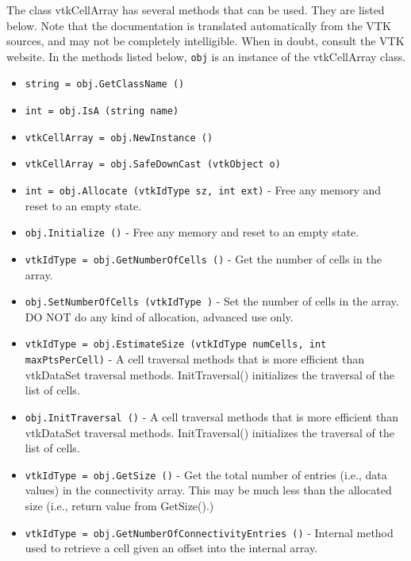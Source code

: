 The class vtkCellArray has several methods that can be used.
  They are listed below.
Note that the documentation is translated automatically from the VTK sources,
and may not be completely intelligible.  When in doubt, consult the VTK website.
In the methods listed below, \verb|obj| is an instance of the vtkCellArray class.
\begin{itemize}
\item  \verb|string = obj.GetClassName ()|

\item  \verb|int = obj.IsA (string name)|

\item  \verb|vtkCellArray = obj.NewInstance ()|

\item  \verb|vtkCellArray = obj.SafeDownCast (vtkObject o)|

\item  \verb|int = obj.Allocate (vtkIdType sz, int ext)| -  Free any memory and reset to an empty state.

\item  \verb|obj.Initialize ()| -  Free any memory and reset to an empty state.

\item  \verb|vtkIdType = obj.GetNumberOfCells ()| -  Get the number of cells in the array.

\item  \verb|obj.SetNumberOfCells (vtkIdType )| -  Set the number of cells in the array.
 DO NOT do any kind of allocation, advanced use only.

\item  \verb|vtkIdType = obj.EstimateSize (vtkIdType numCells, int maxPtsPerCell)| -  A cell traversal methods that is more efficient than vtkDataSet traversal
 methods.  InitTraversal() initializes the traversal of the list of cells.

\item  \verb|obj.InitTraversal ()| -  A cell traversal methods that is more efficient than vtkDataSet traversal
 methods.  InitTraversal() initializes the traversal of the list of cells.

\item  \verb|vtkIdType = obj.GetSize ()| -  Get the total number of entries (i.e., data values) in the connectivity 
 array. This may be much less than the allocated size (i.e., return value 
 from GetSize().)

\item  \verb|vtkIdType = obj.GetNumberOfConnectivityEntries ()| -  Internal method used to retrieve a cell given an offset into
 the internal array.


\end{itemize}
